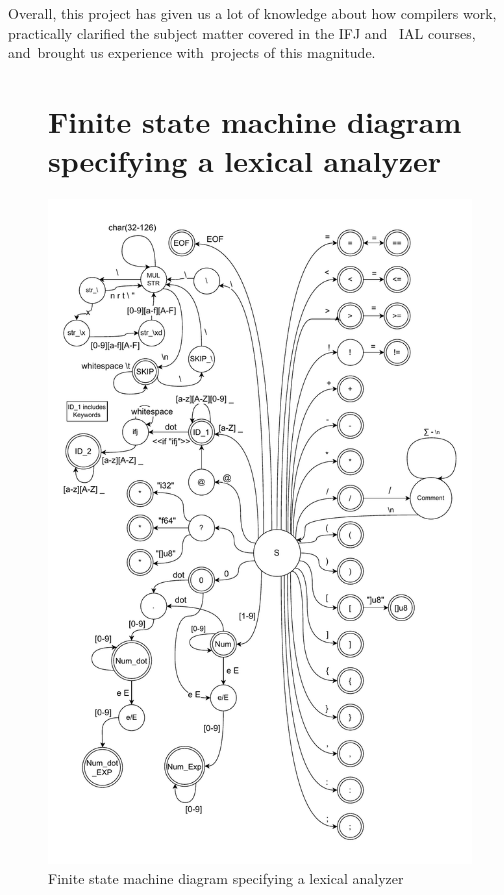 \documentclass[a4paper, 11pt]{article}
\begin{document}
	Overall, this project has given us a lot of knowledge about how compilers work, practically
	clarified the subject matter covered in the IFJ and ~IAL courses, and~brought us experience with~projects of this magnitude.

	\clearpage
	\appendix

	\begin{figure}[!ht]
        \section{Finite state machine diagram specifying a lexical analyzer}
		\centering
		\includegraphics[width=0.8\linewidth]{FSM.pdf}
		\caption{Finite state machine diagram specifying a lexical analyzer}
		\label{figure:fa_graph}
	\end{figure}
\end{document}
